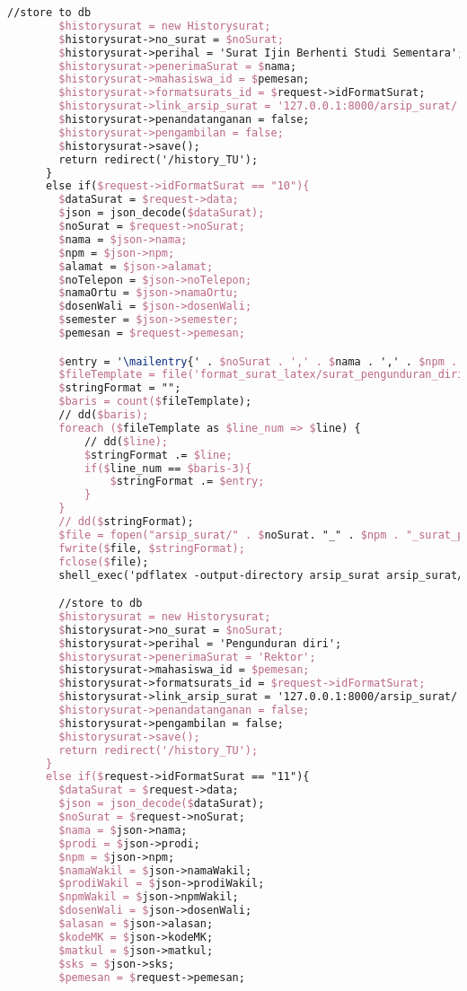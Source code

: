 \begin{lstlisting}[language=tex,basicstyle=\tiny,caption=HistorysuratController.php]
        //store to db
        $historysurat = new Historysurat;
        $historysurat->no_surat = $noSurat;
        $historysurat->perihal = 'Surat Ijin Berhenti Studi Sementara';
        $historysurat->penerimaSurat = $nama;
        $historysurat->mahasiswa_id = $pemesan;
        $historysurat->formatsurats_id = $request->idFormatSurat;
        $historysurat->link_arsip_surat = '127.0.0.1:8000/arsip_surat/' . $noSurat. '_' . $nama . '_surat_izin_cuti_studi.pdf';
        $historysurat->penandatanganan = false;
        $historysurat->pengambilan = false;
        $historysurat->save();
        return redirect('/history_TU');
      }
      else if($request->idFormatSurat == "10"){
        $dataSurat = $request->data;
        $json = json_decode($dataSurat);
        $noSurat = $request->noSurat;
        $nama = $json->nama;
        $npm = $json->npm;
        $alamat = $json->alamat;
        $noTelepon = $json->noTelepon;
        $namaOrtu = $json->namaOrtu;
        $dosenWali = $json->dosenWali;
        $semester = $json->semester;
        $pemesan = $request->pemesan;

        $entry = '\mailentry{' . $noSurat . ',' . $nama . ',' . $npm . ',' . $alamat . ',' . $noTelepon . ',' . $namaOrtu . ',' . $dosenWali . ',' . $semester . ',' . '}';
        $fileTemplate = file('format_surat_latex/surat_pengunduran_diri.tex');
        $stringFormat = "";
        $baris = count($fileTemplate);
        // dd($baris);
        foreach ($fileTemplate as $line_num => $line) {
            // dd($line);
            $stringFormat .= $line;
            if($line_num == $baris-3){
                $stringFormat .= $entry;
            }
        }
        // dd($stringFormat);
        $file = fopen("arsip_surat/" . $noSurat. "_" . $npm . "_surat_pengunduran_diri.tex", "w");
        fwrite($file, $stringFormat);
        fclose($file);
        shell_exec('pdflatex -output-directory arsip_surat arsip_surat/' . $noSurat . '_' . $npm . '_surat_pengunduran_diri.tex');

        //store to db
        $historysurat = new Historysurat;
        $historysurat->no_surat = $noSurat;
        $historysurat->perihal = 'Pengunduran diri';
        $historysurat->penerimaSurat = 'Rektor';
        $historysurat->mahasiswa_id = $pemesan;
        $historysurat->formatsurats_id = $request->idFormatSurat;
        $historysurat->link_arsip_surat = '127.0.0.1:8000/arsip_surat/' . $noSurat. '_' . $npm . '_surat_pengunduran_diri.pdf';
        $historysurat->penandatanganan = false;
        $historysurat->pengambilan = false;
        $historysurat->save();
        return redirect('/history_TU');
      }
      else if($request->idFormatSurat == "11"){
        $dataSurat = $request->data;
        $json = json_decode($dataSurat);
        $noSurat = $request->noSurat;
        $nama = $json->nama;
        $prodi = $json->prodi;
        $npm = $json->npm;
        $namaWakil = $json->namaWakil;
        $prodiWakil = $json->prodiWakil;
        $npmWakil = $json->npmWakil;
        $dosenWali = $json->dosenWali;
        $alasan = $json->alasan;
        $kodeMK = $json->kodeMK;
        $matkul = $json->matkul;
        $sks = $json->sks;
        $pemesan = $request->pemesan;


\end{lstlisting}
